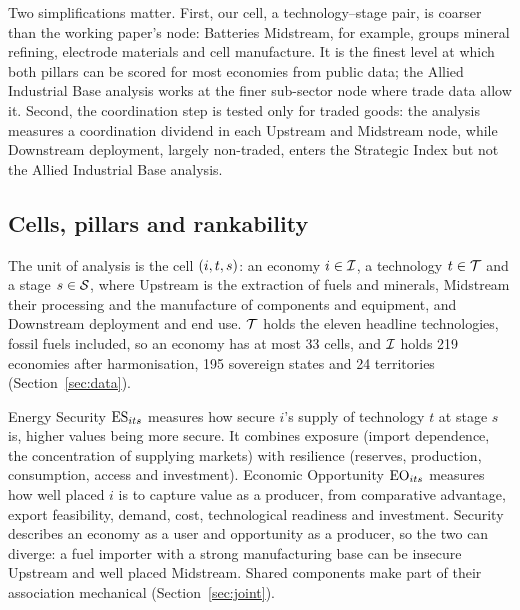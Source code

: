 Two simplifications matter. First, our cell, a technology--stage pair, is coarser than the
working paper's node: Batteries Midstream, for example, groups mineral refining, electrode
materials and cell manufacture. It is the finest level at which both pillars can be scored for
most economies from public data; the Allied Industrial Base analysis works at the finer
sub-sector node where trade data allow it. Second, the coordination step is tested only for traded
goods: the analysis measures a coordination dividend in each Upstream and Midstream node, while
Downstream deployment, largely non-traded, enters the Strategic Index but not the Allied Industrial
Base analysis.

\subsection{Cells, pillars and rankability}\label{subsec:framework_unit}

The unit of analysis is the cell $(i,t,s)$: an economy $i\in\mathcal{I}$, a technology
$t\in\mathcal{T}$ and a stage $s\in\mathcal{S}$, where Upstream is the extraction of fuels and minerals,
Midstream their processing and the manufacture of components and equipment, and Downstream
deployment and end use. $\mathcal{T}$ holds the eleven headline technologies, fossil fuels included,
so an economy has at most 33 cells, and $\mathcal{I}$ holds 219 economies after harmonisation,
195 sovereign states and 24 territories (Section~\ref{sec:data}).

Energy Security $\mathrm{ES}_{its}$ measures how secure $i$'s supply of technology $t$ at stage $s$ is,
higher values being more secure. It combines exposure (import dependence, the concentration of
supplying markets) with resilience (reserves, production, consumption, access and investment).
Economic Opportunity $\mathrm{EO}_{its}$ measures how well placed $i$ is to capture value as a producer,
from comparative advantage, export feasibility, demand, cost, technological readiness and
investment. Security describes an economy as a user and opportunity as a producer, so the two can
diverge: a fuel importer with a strong manufacturing base can be insecure Upstream and well
placed Midstream. Shared components make part of their association mechanical
(Section~\ref{sec:joint}).

